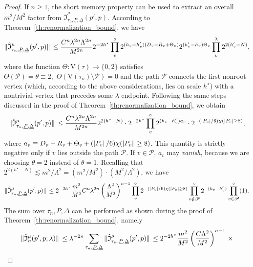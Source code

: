 \documentclass[a4paper, 11pt]{article}
\newcommand{\cutoff}{\Lambda}								%
\newcommand{\vrt}{\mathrm{V}}								%
\theoremstyle{thm}
\begin{document}
\begin{proof}
If $n \ge 1$, the short memory property can be used to extract an overall $m^2/M^2$ factor from $\hat{\mathfrak{I}}^\mu_{\tau_n, \underline{P}, \underline{\Delta}}(p', p)$. According to Theorem~\ref{th:renormalization_bound}, we have
\begin{equation}
\norm*{\hat{\mathfrak{I}}^\mu_{\tau_n, \underline{P}, \underline{\Delta}}(p', p)} \le \frac{C^n \lambda^{2n} \cutoff^{2n}}{M^{2n}} 2^{-2h^\star} \prod^\circ_v 2^{(h_v - h'_v)(D_v - R_v + \Theta_v)} 2^{(h'_v - h_v)\Theta_v} \prod_v^\lambda 2^{2(h'_v - N)},
\end{equation}
where the function $\Theta \colon \vrt(\tau) \to \lbrace 0, 2 \rbrace$ satisfies $\Theta(\mathscr{P}) = \theta \equiv 2, \,\, \Theta(\vrt(\tau_n) \setminus \mathscr{P}) = 0$ and the path $\mathscr{P}$ connects the first nonroot vertex (which, according to the above considerations, lies on scale $h^\star$) with a nontrivial vertex that precedes some $\lambda$ endpoint. Following the same steps discussed in the proof of Theorem~\ref{th:renormalization_bound}, we obtain
\begin{equation}
\norm*{\hat{\mathfrak{I}}^\mu_{\tau_n, \underline{P}, \underline{\Delta}}(p', p)} \le \frac{C^n \lambda^{2n} \cutoff^{2n}}{M^{2n}} 2^{2(h^\star - N)} \cdot 2^{-2h^\star} \prod^\circ_v 2^{(h_v - h'_v) a_v} \cdot 2^{-(\abs*{P_v}/6) \chi(\abs*{P_v} \ge 8)},
\end{equation}
where $a_v \equiv D_v - R_v + \Theta_v + (\abs*{P_v}/6) \chi(\abs*{P_v} \ge 8)$. This quantity is strictly negative only if $v$ lies outside the path $\mathscr{P}$. If $v \in \mathscr{P}$, $a_v$ may \emph{vanish}, because we are choosing $\theta = 2$ instead of $\theta = 1$. Recalling that $2^{2(h^\star - N)} \lesssim m^2/\cutoff^2 = (m^2/M^2) \cdot (M^2/\cutoff^2)$, we have
\begin{equation}
\norm*{\hat{\mathfrak{I}}^\mu_{\tau_n, \underline{P}, \underline{\Delta}}(p', p)} \le  2^{-2h^\star} \frac{m^2}{M^2} C^n \lambda^{2n} \left(\frac{\cutoff^{2}}{M^2} \right)^{n-1} \prod^\circ_v 2^{-(\abs*{P_v}/6) \chi(\abs*{P_v} \ge 8)} \prod^\circ_{v \notin \mathscr{P}} 2^{-(h_v - h'_v)} \prod^\circ_{v \in \mathscr{P}} (1).
\end{equation}
The sum over $\tau_n, \underline{P}, \underline{\Delta}$ can be performed as shown during the proof of Theorem~\ref{th:renormalization_bound}, namely 
\begin{multline}
\norm*{\hat{\mathfrak{I}}^\mu_n(p', p; \lambda)} \le \lambda^{-2n} \sum_{\tau_n, \underline{P}, \underline{\Delta}} \norm*{\hat{\mathfrak{I}}^\mu_{\tau_n, \underline{P}, \underline{\Delta}}(p', p)} \le  2^{-2h^\star} \frac{m^2}{M^2} \left(\frac{C \cutoff^{2}}{M^2} \right)^{n-1}\, \times \\

\end{multline}
\end{proof}
\end{document}
